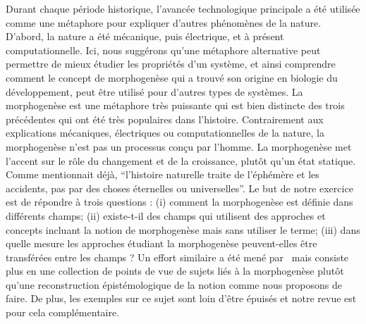 {Durant chaque période historique, l'avancée technologique principale a été utilisée comme une métaphore pour expliquer d'autres phénomènes de la nature. D'abord, la nature a été mécanique, puis électrique, et à présent computationnelle. Ici, nous suggérons qu'une métaphore alternative peut permettre de mieux étudier les propriétés d'un système, et ainsi comprendre comment le concept de morphogenèse qui a trouvé son origine en biologie du développement, peut être utilisé pour d'autres types de systèmes. La morphogenèse est une métaphore très puissante qui est bien distincte des trois précédentes qui ont été très populaires dans l'histoire. Contrairement aux explications mécaniques, électriques ou computationnelles de la nature, la morphogenèse n'est pas un processus conçu par l'homme. La morphogenèse met l'accent sur le rôle du changement et de la croissance, plutôt qu'un état statique. Comme \cite{thompson1942growth} mentionnait déjà, ``l'histoire naturelle traite de l'éphémère et les accidents, pas par des choses éternelles ou universelles''. Le but de notre exercice est de répondre à trois questions : (i) comment la morphogenèse est définie dans différents champs; (ii) existe-t-il des champs qui utilisent des approches et concepts incluant la notion de morphogenèse mais sans utiliser le terme; (iii) dans quelle mesure les approches étudiant la morphogenèse peuvent-elles être transférées entre les champs ? Un effort similaire a été mené par~\cite{bourgine2010morphogenesis} mais consiste plus en une collection de points de vue de sujets liés à la morphogenèse plutôt qu'une reconstruction épistémologique de la notion comme nous proposons de faire. De plus, les exemples sur ce sujet sont loin d'être épuisés et notre revue est pour cela complémentaire.
}







